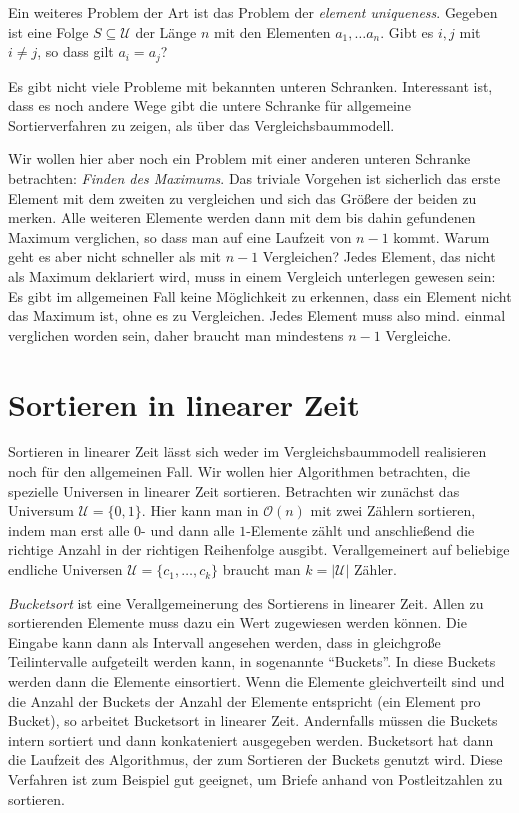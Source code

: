 Ein weiteres Problem der Art ist das Problem der \textit{element uniqueness}. Gegeben ist eine Folge $S \subseteq \mathcal{U}$ der Länge $n$ mit den Elementen $a_1, \ldots a_n$. Gibt es $i,j$ mit $i\neq j$, so dass gilt $a_i = a_j$?

Es gibt nicht viele Probleme mit bekannten unteren Schranken. Interessant ist, dass es noch andere Wege gibt die untere Schranke für allgemeine Sortierverfahren zu zeigen, als über das Vergleichsbaummodell.

Wir wollen hier aber noch ein Problem mit einer anderen unteren Schranke betrachten: \textit{Finden des Maximums}. Das triviale Vorgehen ist sicherlich das erste Element mit dem zweiten zu vergleichen und sich das Größere der beiden zu merken. Alle weiteren Elemente werden dann mit dem bis dahin gefundenen Maximum verglichen, so dass man auf eine Laufzeit von $n-1$ kommt. Warum geht es aber nicht schneller als mit $n-1$ Vergleichen? Jedes Element, das nicht als Maximum deklariert wird, muss in einem Vergleich unterlegen gewesen sein: Es gibt im allgemeinen Fall keine Möglichkeit zu erkennen, dass ein Element nicht das Maximum ist, ohne es zu Vergleichen. Jedes Element muss also mind. einmal verglichen worden sein, daher braucht man mindestens $n-1$ Vergleiche.

\section{Sortieren in linearer Zeit}
Sortieren in linearer Zeit lässt sich weder im Vergleichsbaummodell realisieren noch für den allgemeinen Fall. Wir wollen hier Algorithmen betrachten, die spezielle Universen in linearer Zeit sortieren. Betrachten wir zunächst das Universum $\mathcal{U} = \lbrace 0, 1 \rbrace$. Hier kann man in $\mathcal{O}(n)$ mit zwei Zählern sortieren, indem man erst alle $0$- und dann alle $1$-Elemente zählt und anschließend die richtige Anzahl in der richtigen Reihenfolge ausgibt. Verallgemeinert auf beliebige endliche Universen $\mathcal{U} = \lbrace c_1, \ldots, c_k\rbrace$ braucht man $k = |\mathcal{U}|$ Zähler.

\textit{Bucketsort} ist eine Verallgemeinerung des Sortierens in linearer Zeit. Allen zu sortierenden Elemente muss dazu ein Wert zugewiesen werden können. Die Eingabe kann dann als Intervall angesehen werden, dass in gleichgroße Teilintervalle aufgeteilt werden kann, in sogenannte "`Buckets"'. In diese Buckets werden dann die Elemente einsortiert. Wenn die Elemente gleichverteilt sind und die Anzahl der Buckets der Anzahl der Elemente entspricht (ein Element pro Bucket), so arbeitet Bucketsort in linearer Zeit. Andernfalls müssen die Buckets intern sortiert und dann konkateniert ausgegeben werden. Bucketsort hat dann die Laufzeit des Algorithmus, der zum Sortieren der Buckets genutzt wird. Diese Verfahren ist zum Beispiel gut geeignet, um Briefe anhand von Postleitzahlen zu sortieren.

